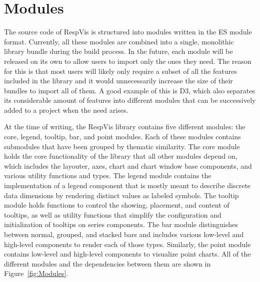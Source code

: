 \chapter{Modules}
\label{chap:Modules}

The source code of RespVis is structured into modules written in the ES module format.
Currently, all these modules are combined into a single, monolithic library bundle during the build process.
In the future, each module will be released on its own to allow users to import only the ones they need.
The reason for this is that most users will likely only require a subset of all the features included in the library and it would unnecessarily increase the size of their bundles to import all of them.
A good example of this is D3, which also separates its considerable amount of features into different modules that can be successively added to a project when the need arises.

At the time of writing, the RespVis library contains five different modules: the core, legend, tooltip, bar, and point modules.
Each of these modules contains submodules that have been grouped by thematic similarity.
The core module holds the core functionality of the library that all other modules depend on, which includes the layouter, axes, chart and chart window base components, and various utility functions and types.
The legend module contains the implementation of a legend component that is mostly meant to describe discrete data dimensions by rendering distinct values as labeled symbols.
The tooltip module holds functions to control the showing, placement, and content of tooltips, as well as utility functions that simplify the configuration and initialization of tooltips on series components.
The bar module distinguishes between normal, grouped, and stacked bars and includes various low-level and high-level components to render each of those types.
Similarly, the point module contains low-level and high-level components to visualize point charts.
All of the different modules and the dependencies between them are shown in Figure~\ref{fig:Modules}.

